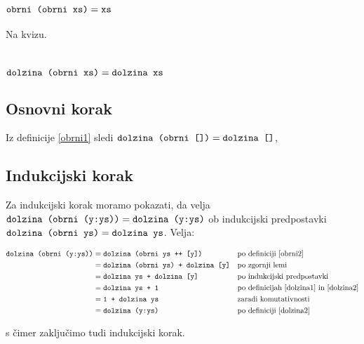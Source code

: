 \documentclass[11pt,a4paper]{article}
\begin{document}
\section{$\mbox{\texttt{obrni (obrni xs)}} = \mbox{\texttt{xs}}$}

Na kvizu.

\section{$\mbox{\texttt{dolzina (obrni xs)}} = \mbox{\texttt{dolzina xs}}$}

\subsection*{Osnovni korak}

Iz definicije \eqref{obrni1} sledi $\mbox{\texttt{dolzina (obrni [])}} = \mbox{\texttt{dolzina []}}$,

\subsection*{Indukcijski korak}

Za indukcijski korak moramo pokazati, da velja $\mbox{\texttt{dolzina (obrni (y:ys))}} = \mbox{\texttt{dolzina (y:ys)}}$ ob indukcijski predpostavki $\mbox{\texttt{dolzina (obrni ys)}} = \mbox{\texttt{dolzina ys}}$.
Velja:

\begin{align*}
  \mbox{\texttt{dolzina (obrni (y:ys))}}
  &= \mbox{\texttt{dolzina (obrni ys ++ [y])}}
    &&\text{po definiciji \eqref{obrni2}} \\
  &= \mbox{\texttt{dolzina (obrni ys) + dolzina [y]}}
    &&\text{po zgornji lemi} \\
  &= \mbox{\texttt{dolzina ys + dolzina [y]}}
    &&\text{po indukcijski predpostavki} \\
  &= \mbox{\texttt{dolzina ys + 1}}
    &&\text{po definicijah \eqref{dolzina1} in \eqref{dolzina2}} \\
  &= \mbox{\texttt{1 + dolzina ys}}
    &&\text{zaradi komutativnosti} \\
  &= \mbox{\texttt{dolzina (y:ys)}}
    &&\text{po definiciji \eqref{dolzina2}}
\end{align*}

s čimer zaključimo tudi indukcijski korak.
\end{document}
